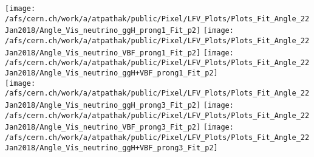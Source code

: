 \documentclass{beamer}
\begin{document}
\begin{frame}
\begin{normalsize}
\begin{center}
\texttt{[image: /afs/cern.ch/work/a/atpathak/public/Pixel/LFV\_Plots/Plots\_Fit\_Angle\_22Jan2018/Angle\_Vis\_neutrino\_ggH\_prong1\_Fit\_p2]}
\texttt{[image: /afs/cern.ch/work/a/atpathak/public/Pixel/LFV\_Plots/Plots\_Fit\_Angle\_22Jan2018/Angle\_Vis\_neutrino\_VBF\_prong1\_Fit\_p2]}
\texttt{[image: /afs/cern.ch/work/a/atpathak/public/Pixel/LFV\_Plots/Plots\_Fit\_Angle\_22Jan2018/Angle\_Vis\_neutrino\_ggH+VBF\_prong1\_Fit\_p2]}\\
\texttt{[image: /afs/cern.ch/work/a/atpathak/public/Pixel/LFV\_Plots/Plots\_Fit\_Angle\_22Jan2018/Angle\_Vis\_neutrino\_ggH\_prong3\_Fit\_p2]}
\texttt{[image: /afs/cern.ch/work/a/atpathak/public/Pixel/LFV\_Plots/Plots\_Fit\_Angle\_22Jan2018/Angle\_Vis\_neutrino\_VBF\_prong3\_Fit\_p2]}
\texttt{[image: /afs/cern.ch/work/a/atpathak/public/Pixel/LFV\_Plots/Plots\_Fit\_Angle\_22Jan2018/Angle\_Vis\_neutrino\_ggH+VBF\_prong3\_Fit\_p2]}\\
\end{center}
\end{normalsize}
\end {frame}
\end{document}
